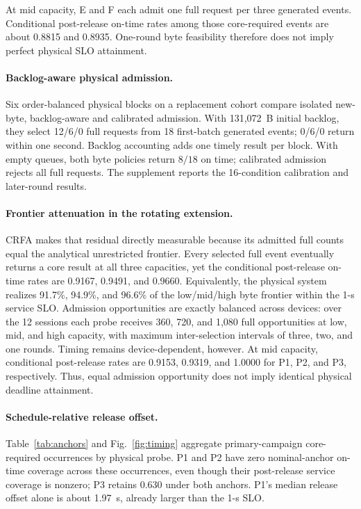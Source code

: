 \documentclass[10pt,journal]{IEEEtran}
\newcommand{\CRFA}{\textsc{CRFA}}
\begin{document}
At mid capacity, E and F each admit one full request per three generated
events. Conditional post-release on-time rates among those core-required
events are about 0.8815 and 0.8935. One-round byte feasibility therefore does
not imply perfect physical SLO attainment.

\paragraph{Backlog-aware physical admission.}
Six order-balanced physical blocks on a replacement cohort compare isolated
new-byte, backlog-aware and calibrated admission. With 131,072~B initial
backlog, they select 12/6/0 full requests from 18 first-batch generated events;
0/6/0 return within one second. Backlog accounting adds one timely result
per block. With empty queues, both byte policies return $8/18$ on time;
calibrated admission rejects all full requests. The supplement reports the
16-condition calibration and later-round results.

\paragraph{Frontier attenuation in the rotating extension.}
\CRFA{} makes that residual directly measurable because its admitted full
counts equal the analytical unrestricted frontier. Every selected full event
eventually returns a core result at all three capacities, yet the conditional
post-release on-time rates are 0.9167, 0.9491, and 0.9660. Equivalently,
the physical system realizes 91.7\%, 94.9\%, and 96.6\% of the low/mid/high
byte frontier within the 1-s service SLO. Admission opportunities are exactly
balanced across devices: over the 12 sessions each probe receives 360, 720,
and 1,080 full opportunities at low, mid, and high capacity, with maximum
inter-selection intervals of three, two, and one rounds. Timing remains
device-dependent, however. At mid capacity, conditional post-release rates are
0.9153, 0.9319, and 1.0000 for P1, P2, and P3, respectively. Thus, equal
admission opportunity does not imply identical physical deadline attainment.

\paragraph{Schedule-relative release offset.}
Table~\ref{tab:anchors} and Fig.~\ref{fig:timing} aggregate primary-campaign
core-required occurrences by physical probe. P1 and P2 have zero nominal-anchor on-time coverage across
these occurrences, even though their post-release service coverage is
nonzero; P3 retains 0.630 under both anchors. P1's median release offset alone
is about 1.97~s, already larger than the 1-s SLO.
\end{document}
